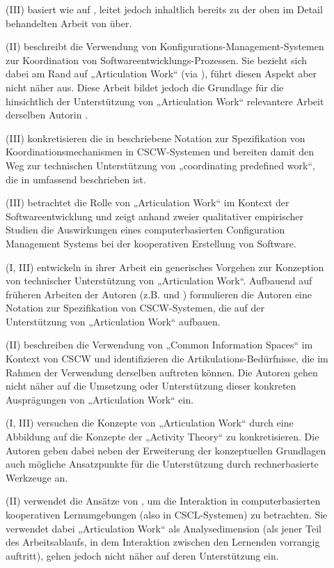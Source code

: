 \begin{description}
	\item[\citet{Schmidt95}] (III) basiert wie \citep{Schmidt94} auf \citep{Schmidt90}, leitet jedoch inhaltlich bereits zu der oben im Detail behandelten Arbeit von \citet{Schmidt96} über.
	\item[\citet{Grinter95}] (II) beschreibt die Verwendung von Konfigurations-Management-Systemen zur Koordination von Softwareentwicklungs-Prozessen. Sie bezieht sich dabei am Rand auf „Articulation Work“ (via \citep{Schmidt92}), führt diesen Aspekt aber nicht näher aus. Diese Arbeit bildet jedoch die Grundlage für die hinsichtlich der Unterstützung von „Articulation Work“ relevantere Arbeit derselben Autorin \citep{Grinter96}.
	\item[\citet{Simone95}] (III) konkretisieren die in \citet{Schmidt96} beschriebene Notation zur Spezifikation von Koordinationsmechanismen in \gls{CSCW}-Systemen und bereiten damit den Weg zur technischen Unterstützung von „coordinating predefined work“, die in \citep{Divitini00} umfassend beschrieben ist.
	\item[\citet{Grinter96}] (III) betrachtet die Rolle von „Articulation Work“ im Kontext der Softwareentwicklung und zeigt anhand zweier qualitativer empirischer Studien die Auswirkungen eines computerbasierten Configuration Management Systems bei der kooperativen Erstellung von Software.
	\item[\citet{Schmidt96}] (I, III) entwickeln in ihrer Arbeit ein generisches Vorgehen zur Konzeption von technischer Unterstützung von „Articulation Work“. Aufbauend auf früheren Arbeiten der Autoren (z.B. \citep{Schmidt90} und \citep{Schmidt92}) formulieren die Autoren eine Notation zur Spezifikation von \gls{CSCW}-Systemen, die auf der Unterstützung von „Articulation Work“ aufbauen.
	\item[\citet{Bannon97}] (II) beschreiben die Verwendung von „Common Information Spaces“ im Kontext von \gls{CSCW} und identifizieren die Artikulations-Bedürfnisse, die im Rahmen der Verwendung derselben auftreten können. Die Autoren gehen nicht näher auf die Umsetzung oder Unterstützung dieser konkreten Ausprägungen von „Articulation Work“ ein.
	\item[\citet{Fjuk97}] (I, III) versuchen die Konzepte von „Articulation Work“ durch eine Abbildung auf die Konzepte der „Activity Theory“ zu konkretisieren. Die Autoren geben dabei neben der Erweiterung der konzeptuellen Grundlagen auch mögliche Ansatzpunkte für die Unterstützung durch rechnerbasierte Werkzeuge an.
	\item[\citet{Fjuk97a}] (II) verwendet die Ansätze von \citet{Strauss93}, um die Interaktion in computerbasierten kooperativen Lernumgebungen (also in \gls{CSCL}-Systemen) zu betrachten. Sie verwendet dabei „Articulation Work“ als Analysedimension (als jener Teil des Arbeitsablaufs, in dem Interaktion zwischen den Lernenden vorrangig auftritt), gehen jedoch nicht näher auf deren Unterstützung ein.

\end{description}
